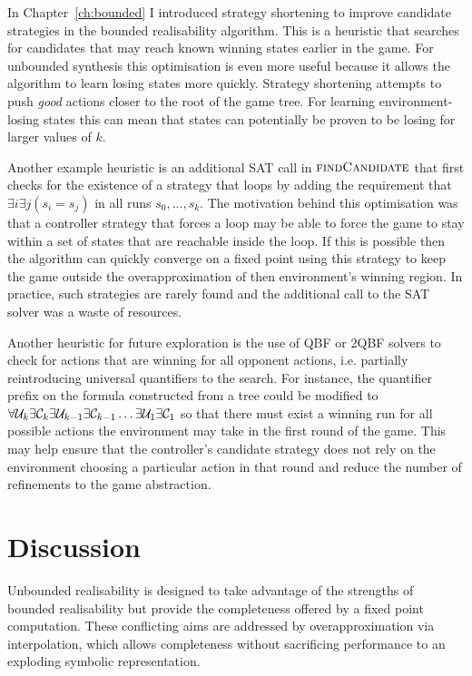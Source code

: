 In Chapter~\ref{ch:bounded} I introduced strategy shortening to improve candidate strategies in the bounded realisability algorithm. This is a heuristic that searches for candidates that may reach known winning states earlier in the game.  For unbounded synthesis this optimisation is even more useful because it allows the algorithm to learn losing states more quickly.  Strategy shortening attempts to push \emph{good} actions closer to the root of the game tree. For learning environment-losing states this can mean that states can potentially be proven to be losing for larger values of $k$. 

Another example heuristic is an additional SAT call in $\textsc{findCandidate}$ that first checks for the existence of a strategy that loops by adding the requirement that $\exists i \exists j (s_i = s_j)$ in all runs $s_0, ..., s_k$. The motivation behind this optimisation was that a controller strategy that forces a loop may be able to force the game to stay within a set of states that are reachable inside the loop. If this is possible then the algorithm can quickly converge on a fixed point using this strategy to keep the game outside the overapproximation of then environment's winning region.  In practice, such strategies are rarely found and the additional call to the SAT solver was a waste of resources. 

Another heuristic for future exploration is the use of QBF or 2QBF solvers to check for actions that are winning for all opponent actions, i.e. partially reintroducing universal quantifiers to the search. For instance, the quantifier prefix on the formula constructed from a tree could be modified to $\forall \mathcal{U}_k \exists \mathcal{C}_k \exists \mathcal{U}_{k-1} \exists \mathcal{C}_{k-1} \ldots \exists \mathcal{U}_1 \exists \mathcal{C}_1$ so that there must exist a winning run for all possible actions the environment may take in the first round of the game. This may help ensure that the controller's candidate strategy does not rely on the environment choosing a particular action in that round and reduce the number of refinements to the game abstraction.

\section{Discussion}

Unbounded realisability is designed to take advantage of the strengths of bounded realisability but provide the completeness offered by a fixed point computation. These conflicting aims are addressed by overapproximation via interpolation, which allows completeness without sacrificing performance to an exploding symbolic representation.

